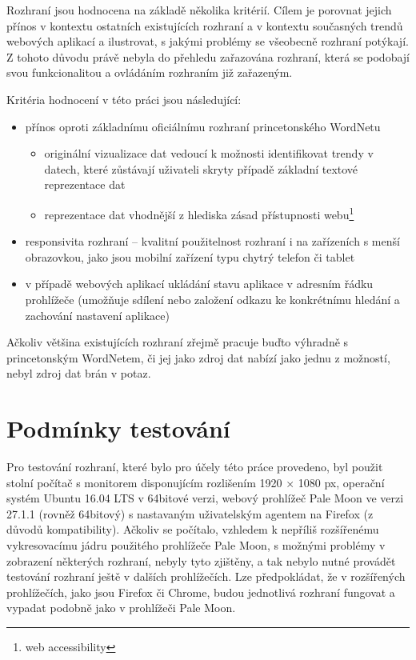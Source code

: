 \documentclass[a4paper, 11pt, oneside]{book}
\begin{document}
				Rozhraní jsou hodnocena na základě několika kritérií. Cílem je porovnat jejich přínos v kontextu ostatních existujících rozhraní a v kontextu současných trendů webových aplikací a ilustrovat, s jakými problémy se všeobecně rozhraní potýkají.  Z tohoto důvodu právě nebyla do přehledu zařazována rozhraní, která se podobají svou funkcionalitou a ovládáním rozhraním již zařazeným. 

				Kritéria hodnocení v této práci jsou následující:

					\begin{itemize}
						\item přínos oproti základnímu oficiálnímu rozhraní princetonského WordNetu
							\begin{itemize}
								\item originální vizualizace dat vedoucí k možnosti identifikovat trendy v datech, které zůstávají uživateli skryty případě základní textové reprezentace dat
								\item reprezentace dat vhodnější z hlediska zásad přístupnosti webu\footnote{web accessibility}
							\end{itemize}
						\item responsivita rozhraní -- kvalitní použitelnost rozhraní i na zařízeních s menší obrazovkou, jako jsou mobilní zařízení typu chytrý telefon či tablet
						\item v případě webových aplikací ukládání stavu aplikace v adresním řádku prohlížeče (umožňuje sdílení nebo založení odkazu ke konkrétnímu hledání a zachování nastavení aplikace)
					\end{itemize}

				Ačkoliv většina existujících rozhraní zřejmě pracuje buďto výhradně s princetonským WordNetem, či jej jako zdroj dat nabízí jako jednu z možností, nebyl zdroj dat brán v potaz.

			\section{Podmínky testování}

				Pro testování rozhraní, které bylo pro účely této práce provedeno, byl použit stolní počítač s monitorem disponujícím rozlišením 1920 × 1080 px, operační systém Ubuntu 16.04 LTS v 64bitové verzi, webový prohlížeč Pale Moon ve verzi 27.1.1 (rovněž 64bitový) s nastavaným uživatelským agentem na Firefox (z důvodů kompatibility). Ačkoliv se počítalo, vzhledem k nepříliš rozšířenému vykresovacímu jádru použitého prohlížeče Pale Moon, s možnými problémy v zobrazení některých rozhraní, nebyly tyto zjištěny, a tak nebylo nutné provádět testování rozhraní ještě v dalších prohlížečích. Lze předpokládat, že v rozšířených prohlížečích, jako jsou Firefox či Chrome, budou jednotlivá rozhraní fungovat a vypadat podobně jako v prohlížeči Pale Moon.
\end{document}
